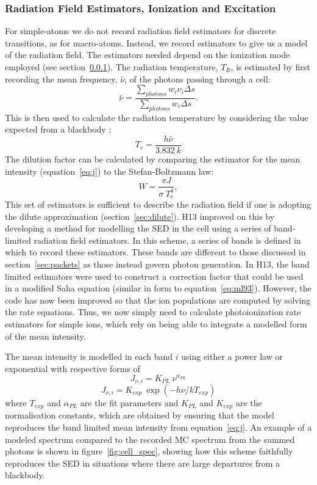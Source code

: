 \subsubsection{Radiation Field Estimators, Ionization and Excitation}
\label{sec:simple_ionization}
For simple-atoms we do not record radiation field estimators for discrete 
transitions, as for macro-atoms. Instead, we record estimators to
give us a model of the radiation field. The estimators needed
depend on the ionization mode employed (see section~\ref{sec:simple_ionization}).
The radiation temperature, $T_R$, is estimated by first recording the mean frequency, 
$\bar{\nu}$, of the photons passing through a cell:
\begin{equation}
\bar{\nu} = \frac{\sum_{photons} w_i \nu_i \Delta s}{\sum_{photons} w_i \Delta s}.
\end{equation}
This is then used to calculate the radiation temperature by
considering the value expected from a blackbody \citep{ML93}:
\begin{equation}
T_r = \frac{h\bar{\nu}}{3.832~k}
\end{equation}
The dilution factor can be calculated by comparing the estimator for the mean intensity (equation~\ref{eq:j}) to the Stefan-Boltzmann law:
\begin{equation}
W = \frac{\pi J}{\sigma~T_r^4},
\end{equation}
This set of estimators is sufficient to describe the 
radiation field if one is adopting the dilute approximation (section~\ref{sec:dilute}).
H13 improved on this by developing a method for
modelling the SED in the cell using a series of band-limited 
radiation field estimators. In this scheme, a series of bands is defined
in which to record these estimators. These bands are different to those
discussed in section~\ref{sec:packets} as those instead govern photon generation.
In H13, the band limited estimators were used to construct a correction factor
that could be used in a modified Saha equation 
(similar in form to equation~\ref{eq:ml93}). However, the code has now been
improved so that the ion populations are computed by solving the rate equations.
Thus, we now simply need to calculate photoionization rate estimators for simple 
ions, which rely on being able to integrate a modelled form of the mean intensity.

The mean intensity is modelled in each band $i$ using either a power law or exponential
with respective forms of
\begin{equation}
J_{\nu,i} = K_{PL}~ \nu^{\alpha_{PL}}
\end{equation}
\begin{equation}
J_{\nu,i} = K_{exp}~ \exp(-h\nu / k T_{exp})
\end{equation}
where $T_{exp}$ and $\alpha_{PL}$ are the fit parameters and $K_{PL}$ and $K_{exp}$ 
are the normalisation constants, which are obtained by ensuring that
the model reproduces the band limited mean intensity from equation~\ref{eq:j}.
An example of a modeled spectrum compared to the recorded MC spectrum from
the summed photons is shown in figure~\ref{fig:cell_spec}, showing how
this scheme faithfully reproduces the SED in situations where there are large departures
from a blackbody. 

